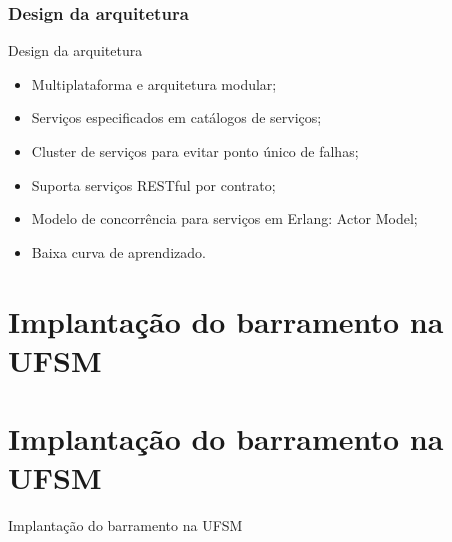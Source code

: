 \documentclass{beamer}
\begin{document}
\begin{frame}
\frametitle{Design da arquitetura}

\begin{exampleblock}{Design da arquitetura}
	
	\begin{itemize}
		\item<1->Multiplataforma e arquitetura modular;
		\item<1->Serviços especificados em catálogos de serviços;
		\item<1->Cluster de serviços para evitar ponto único de falhas;
		\item<1->Suporta serviços RESTful por contrato;
		\item<1->Modelo de concorrência para serviços em Erlang: Actor Model;
		\item<1->Baixa curva de aprendizado.
	\end{itemize}
	
\end{exampleblock}


\end{frame}










\section{Implantação do barramento na UFSM}


\section{Implantação do barramento na UFSM}


\begin{frame}[c]{ }
\centering
\huge{Implantação do barramento na UFSM}
\end{frame}
\end{document}
